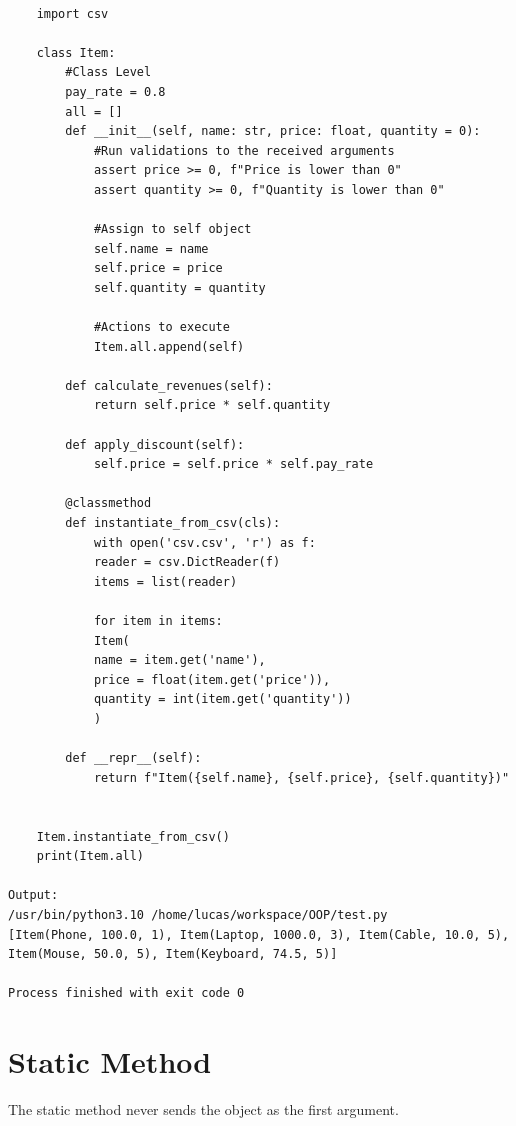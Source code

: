 \documentclass{article}
\begin{document}
\begin{lstlisting}
	
	import csv
	
	class Item:
		#Class Level
		pay_rate = 0.8
		all = []
		def __init__(self, name: str, price: float, quantity = 0):
			#Run validations to the received arguments
			assert price >= 0, f"Price is lower than 0"
			assert quantity >= 0, f"Quantity is lower than 0"
			
			#Assign to self object
			self.name = name
			self.price = price
			self.quantity = quantity
			
			#Actions to execute
			Item.all.append(self)
			
		def calculate_revenues(self):
			return self.price * self.quantity
			
		def apply_discount(self):
			self.price = self.price * self.pay_rate
		
		@classmethod
		def instantiate_from_csv(cls):
			with open('csv.csv', 'r') as f:
			reader = csv.DictReader(f)
			items = list(reader)
			
			for item in items:
			Item(
			name = item.get('name'),
			price = float(item.get('price')),
			quantity = int(item.get('quantity'))
			)
			
		def __repr__(self):
			return f"Item({self.name}, {self.price}, {self.quantity})"
		
		
	Item.instantiate_from_csv()
	print(Item.all)
	
Output:
/usr/bin/python3.10 /home/lucas/workspace/OOP/test.py 
[Item(Phone, 100.0, 1), Item(Laptop, 1000.0, 3), Item(Cable, 10.0, 5), Item(Mouse, 50.0, 5), Item(Keyboard, 74.5, 5)]

Process finished with exit code 0
\end{lstlisting}

\section{Static Method}
The static method never sends the object as the first argument.
\end{document}
